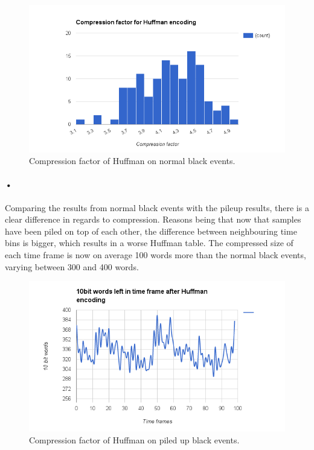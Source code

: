 \documentclass[a4paper, 12pt]{report}
\begin{document}
\begin{figure}[h!]
	\centering
		\includegraphics[width=1.0\textwidth]{images/compression-factor-huffman.png}
		\caption{Compression factor of Huffman on normal black events.}
		\label{fig:compression-factor-huffman}
\end{figure}

\paragraph{•}
Comparing the results from normal black events with the pileup results, there is a clear difference in regards to compression.
Reasons being that now that samples have been piled on top of each other, the difference between neighbouring time bins is bigger, which results in a worse Huffman table.
The compressed size of each time frame is now on average 100 words more than the normal black events, varying between 300 and 400 words.

\begin{figure}[h!]
	\centering
		\includegraphics[width=1.0\textwidth]{images/blackevents-pileup-huffman.png}
		\caption{Compression factor of Huffman on piled up black events.}
		\label{fig:blackevents-huffman-pileup}
\end{figure}
\end{document}
